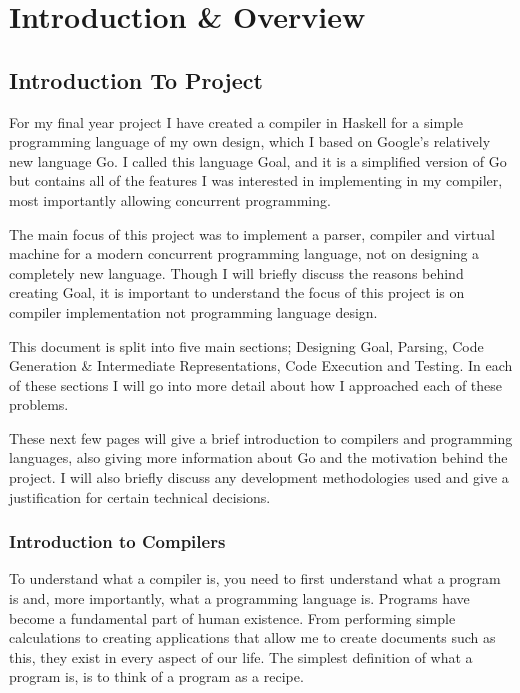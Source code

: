 
\chapter{Introduction \& Overview}

\section{Introduction To Project}

For my final year project I have created a compiler in Haskell for a simple programming language of my own design, which I based on Google's relatively new language Go. I called this language Goal, and it is a simplified version of Go but contains all of the features I was interested in implementing in my compiler, most importantly allowing concurrent programming.

The main focus of this project was to implement a parser, compiler and virtual machine for a modern concurrent programming language, not on designing a completely new language. Though I will briefly discuss the reasons behind creating Goal, it is important to understand the focus of this project is on compiler implementation not programming language design.

This document is split into five main sections; Designing Goal, Parsing, Code Generation \& Intermediate Representations, Code Execution and Testing. In each of these sections I will go into more detail about how I approached each of these problems. 

These next few pages will give a brief introduction to compilers and programming languages, also giving more information about Go and the motivation behind the project. I will also briefly discuss any development methodologies used and give a justification for certain technical decisions.

\subsection{Introduction to Compilers}

To understand what a compiler is, you need to first understand what a program is and, more importantly, what a programming language is. Programs have become a fundamental part of human existence. From performing simple calculations to creating applications that allow me to create documents such as this, they exist in every aspect of our life. The simplest definition of what a program is, is to think of a program as a recipe.  

